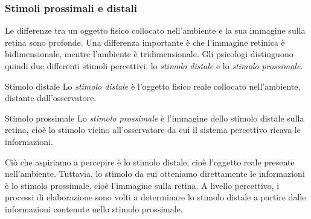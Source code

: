 \documentclass[a4paper]{article}
\begin{document}
\subsubsection{Stimoli prossimali e distali}
Le differenze tra un oggetto fisico collocato nell'ambiente e la sua immagine sulla retina sono profonde. Una differenza importante è che l'immagine retinica è bidimensionale, mentre l'ambiente è tridimensionale.
Gli psicologi distinguono quindi due differenti stimoli percettivi: lo \emph{stimolo distale} e lo \emph{stimolo prossimale}.
\begin{snippetdefinition}{Stimolo distale}
    Lo \emph{stimolo distale} è l'oggetto fisico reale collocato nell'ambiente, distante dall'osservatore.
\end{snippetdefinition}
\begin{snippetdefinition}{Stimolo prossimale}
    Lo \emph{stimolo prossimale} è l'immagine dello stimolo distale sulla retina, cioè lo stimolo vicino all'osservatore da cui il sistema percettivo ricava le informazioni.
\end{snippetdefinition}
Ciò che aspiriamo a percepire è lo stimolo distale, cioè l'oggetto reale presente nell'ambiente. Tuttavia, lo stimolo da cui otteniamo direttamente le informazioni è lo stimolo prossimale, cioè l'immagine sulla retina.
A livello percettivo, i processi di elaborazione sono volti a determinare lo stimolo distale a partire dalle informazioni contenute nello stimolo prossimale.
\end{document}
